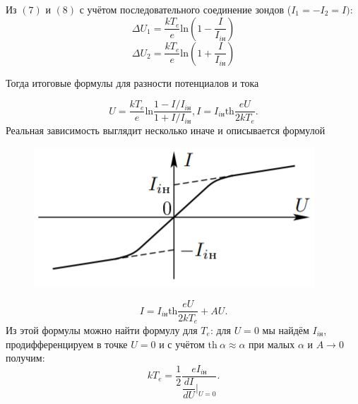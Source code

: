 \documentclass[a4paper,12pt]{article}
\begin{document}
Из $(7)$ и $(8)$ с учётом последовательного соединение зондов ($I_1 = -I_2 = I)$:
$$
\Delta U_1= \dfrac{kT_e}{e}\text{ln}\left(1 - \dfrac{I}{I_{i\text{н}}}\right)
$$
$$
\Delta U_2= \dfrac{kT_e}{e}\text{ln}\left(1 + \dfrac{I}{I_{i\text{н}}}\right)
$$

Тогда итоговые формулы для разности потенциалов и тока

\begin{equation}
U = \dfrac{kT_e}{e}\text{ln}\dfrac{1 - I/I_{i\text{н}}}{1 + I/I_{i\text{н}}},
I = I_{i\text{н}} \text{th}\dfrac{eU}{2kT_e}.
\end{equation}
Реальная зависимость выглядит несколько иначе и описывается формулой
\begin{figure}
\includegraphics[scale=0.8]{4.png}
\vspace{+30pt}
\end{figure}
\begin{equation}
I = I_{i\text{н}} \text{th}\dfrac{eU}{2kT_e} + AU.
\end{equation}
Из этой формулы можно найти формулу для $T_e$: для $U=0$ мы найдём $I_{i\text{н}}$, продифференцируем в точке $U=0$ и с учётом $\text{th}~\alpha \approx \alpha$ при малых $\alpha$ и $A\rightarrow 0$ получим:
\begin{equation}
kT_e = \dfrac{1}{2}\dfrac{eI_{i\text{н}}}{\dfrac{dI}{dU}|_{U=0}}.
\end{equation}
\end{document}
